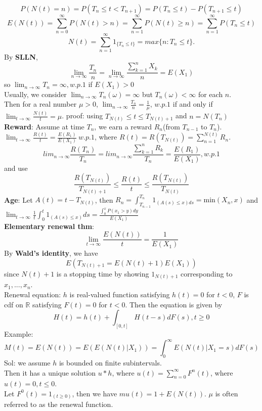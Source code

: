 \documentclass{amsart}
\newcommand{\bbr}{\mathbb{R}}
\theoremstyle{plain}
\theoremstyle{definition}
\begin{document}
	
	\[P(N(t)= n) = P(T_n \leq t < T_{n+1}) = P(T_n \leq t ) - P(T_{n+1} \leq t) \]  
  	\[E(N(t)) = \sum_{n=0}^{\infty} P(N(t) >n)= \sum_{n=1}^{\infty} P(N(t) \geq n) = \sum_{n=1}^{\infty}P(T_n \leq t)\]
	\[N(t) = \sum_{n=1}^{\infty}1_{\{T_n \leq t\}}  = max\{n:T_n \leq t\}.\]
	By \textbf{SLLN}, 
	\[ \lim_{n\to \infty} \frac{T_n}{n} = \lim_{n\to \infty}\frac{\sum_{k=1}^nX_k}{n} = E(X_1)\]
	so $\lim_{n\to \infty} T_n = \infty, w.p.1$ if $E(X_1) > 0$\\
	Usually, we consider $\lim_{n\to \infty} T_n(\omega) = \infty$ but $T_n(\omega) < \infty$ for each $n$. \\
	Then for a real number $\mu > 0$, $\lim_{n\to \infty}\frac{T_n}{n} = \frac{1}{\mu}$, $w.p.1$ if and only if $\lim_{t\to \infty}\frac{N(t)}{t} = \mu$. proof: using $T_{N(t)} \leq t \leq T_{N(t)+1}$ and $n=N(T_n)$\\
	\textbf{Reward}: Assume at time $T_n$, we earn a reward $R_n$(from $T_{n-1}$ to $T_n$). $\lim_{t\to \infty}\frac{R(t)}{t} = \frac{E(R_1)}{E(X_1)}\ w.p.1$, where $R(t) = R(T_{N(t)})=  \sum_{n=1}^{N(t)}R_n$.\\
	\[lim_{n\to \infty} \frac{R(T_n)}{T_n} = lim_{n\to \infty} \frac{\sum_{k=1}^{n}R_k}{T_n} = \frac{E(R_1)}{E(X_1)}, w.p.1\]
	and use 
	\[ \frac{R(T_{N(t)})}{T_{N(t)+1}} \leq \frac{R(t)}{t} \leq \frac{R(T_{N(t)})}{T_{N(t)}}\]
	\textbf{Age}: Let $A(t) = t-T_{N(t)}$, then $R_n = \int_{T_{n-1}}^{T_n} 1_{(A(s) \leq x)ds} = \text{min}(X_n,x)$ and $\lim_{t\to \infty}\frac{1}{t}\int_{0}^t1_{(A(s) \leq x)} ds  = \frac{\int_{0}^x P(x_1 > y)dy}{E(X_1)}$ \\
	\textbf{Elementary renewal thm}: \[ \lim_{t\to \infty} \frac{E(N(t))}{t} = \frac{1}{E(X_1)}\]
	By \textbf{Wald's identity}, we have 
	\[E(T_{N(t)+1} = E(N(t)+1)E(X_1))\]
	since $N(t)+1$ is a stopping time by showing $1_{N(t) + 1}$ corresponding to $x_1,...,x_n$.\\
	Renewal equation: $h$ is real-valued function satisfying $h(t)= 0$ for $t < 0$, $F$ is cdf on $\bbr$ satisfying $F(t)= 0$ for $t < 0$. Then the equation is given by 
	\[ H(t) = h(t) + \int_{[0,t]}H(t-s)dF(s), t\geq 0\]
Example:
\[M(t) = E(N(t)) = E(E(N(t)|X_1)) = \int_{0}^{\infty}E(N(t)|X_1=s)dF(s)\]
Sol: we assume $h$ is bounded on finite subintervals.\\
Then it has a unique solution $u*h$, where $u(t) = \sum_{n=0}^{\infty}F^n(t)$, where $u(t) = 0,t \leq 0$.\\
Let $F^0(t) = 1_{(t \geq 0)}$, then we have $mu(t) = 1+ E(N(t))$. $\mu$ is often referred to as the renewal function.\\
\end{document}
